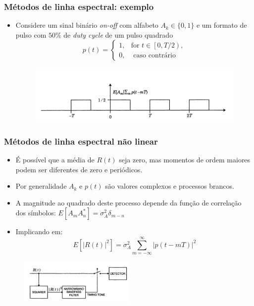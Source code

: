 \begin{frame}
	\frametitle{Métodos de linha espectral: exemplo}
	
	\begin{itemize}
		\item Considere um sinal binário \textit{on-off} com alfabeto $A_k\in \{0,1\}$ e um formato de pulso com $50\%$ de \textit{duty cycle} de um pulso quadrado
		\begin{equation*}
		p(t) = \begin{cases}
		1,& \text{for }t\in \left[ 0,T/2 \right) ,\\
		0,& \text{ caso contrário }
		\end{cases}
		\end{equation*}
		
		\begin{figure}
			\centering
			\includegraphics[width=.85\textwidth]{figs/on_off_pulse}
		\end{figure}
	\end{itemize}			
\end{frame}


\begin{frame}
	\frametitle{Métodos de linha espectral não linear}
	
	\begin{itemize}
		\item É possível que a média de $R(t)$ seja zero, mas momentos de ordem maiores podem ser diferentes de zero e periódicos.
			\item Por generalidade $A_k$ e $p(t)$ são valores complexos e processos brancos.
			\item A magnitude ao quadrado deste processo depende da função de correlação dos símbolos: $E[A_mA_n^*] = \sigma_A^2\delta_ {m-n}$
			\item Implicando em:
			\begin{equation*}
			E[|R(t)|^2] = \sigma_A^2\sum_{m=-\infty}^{\infty}|p(t-mT)|^2
			\end{equation*}
		\end{itemize}
		
		\begin{figure}
			\includegraphics[width=0.5\textwidth]{figs/linha_espectral_nlinear}
		\end{figure}
\end{frame}

